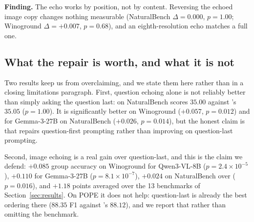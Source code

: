 \begin{finding}
\textbf{Finding.} The echo works by position, not by content. Reversing the
echoed image copy changes nothing measurable (NaturalBench $\Delta = 0.000$,
$p = 1.00$; Winoground $\Delta = +0.007$, $p = 0.68$), and an
eighth-resolution echo matches a full one.
\end{finding}

\subsection{What the repair is worth, and what it is not}
\label{sec:method-honest}

Two results keep us from overclaiming, and we state them here rather than in a
closing limitations paragraph. First, question echoing alone is not reliably
better than simply asking the question last: on NaturalBench \stit{} scores
$35.00$ against \sit{}'s $35.05$ ($p = 1.00$). It is significantly better on
Winoground ($+0.057$, $p = 0.012$) and for Gemma-3-27B on NaturalBench
($+0.026$, $p = 0.014$), but the honest claim is that \stit{} repairs
question-first prompting rather than improving on question-last prompting.

Second, image echoing is a real gain over question-last, and this is the claim we
defend: $+0.085$ group accuracy on Winoground for Qwen3-VL-8B
($p = 2.4\times10^{-5}$), $+0.110$ for Gemma-3-27B ($p = 8.1\times10^{-7}$),
$+0.024$ on NaturalBench over \stit{} ($p = 0.016$), and $+1.18$ points averaged
over the 13 benchmarks of Section~\ref{sec:results}. On POPE it does not help:
question-last is already the best ordering there ($88.35$ F1 against \sitit{}'s
$88.12$), and we report that rather than omitting the benchmark.
